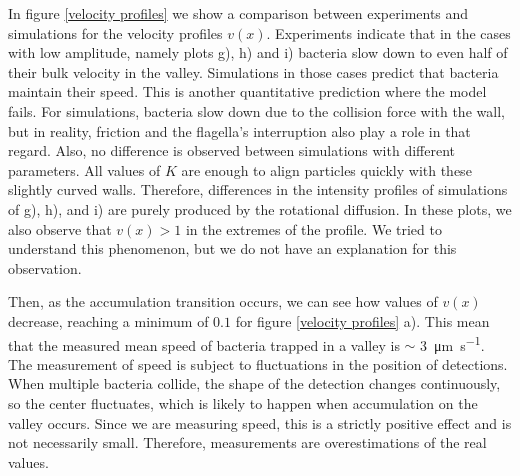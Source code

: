 
In figure \ref{velocity profiles} we show a comparison between experiments and simulations for the velocity profiles $v(x)$. Experiments indicate that in the cases with low amplitude, namely plots g), h) and i) bacteria slow down to even half of their bulk velocity in the valley. Simulations in those cases predict that bacteria maintain their speed. This is another quantitative prediction where the model fails. For simulations, bacteria slow down due to the collision force with the wall, but in reality, friction and the flagella's interruption also play a role in that regard. Also, no difference is observed between simulations with different parameters. All values of $K$ are enough to align particles quickly with these slightly curved walls. Therefore, differences in the intensity profiles of simulations of g), h), and i) are purely produced by the rotational diffusion. In these plots, we also observe that $v(x)>1$ in the extremes of the profile. We tried to understand this phenomenon, but we do not have an explanation for this observation.

Then, as the accumulation transition occurs, we can see how values of $v(x)$ decrease, reaching a minimum of $0.1$ for figure \ref{velocity profiles} a). This mean that the measured mean speed of bacteria trapped in a valley is $\sim$ \SI[per-mode = symbol]{3}{\micro\meter\per\second}. The measurement of speed is subject to fluctuations in the position of detections. When multiple bacteria collide, the shape of the detection changes continuously, so the center fluctuates, which is likely to happen when accumulation on the valley occurs. Since we are measuring speed, this is a strictly positive effect and is not necessarily small. Therefore, measurements are overestimations of the real values.

